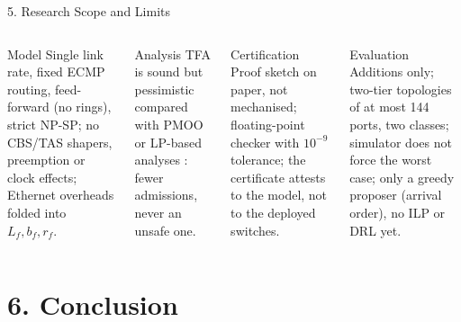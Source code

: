 \documentclass[xcolor=x11names,t,aspectratio=169]{beamer}
\begin{document}
\begin{frame}{5. Research Scope and Limits}
\small
\begin{columns}[T,totalwidth=\textwidth]
\begin{block}{Model}
Single link rate, fixed ECMP routing, feed-forward (no rings), strict NP-SP; no CBS/TAS shapers, preemption or clock effects; Ethernet overheads folded into $L_f,b_f,r_f$.
\end{block}
\begin{block}{Analysis}
TFA is sound but pessimistic compared with PMOO or LP-based analyses \cite{bondorf2014discodnc,bouillard2018dnc}: fewer admissions, never an unsafe one.
\end{block}
\begin{block}{Certification}
Proof sketch on paper, not mechanised; floating-point checker with $10^{-9}$ tolerance; the certificate attests to the model, not to the deployed switches.
\end{block}
\begin{block}{Evaluation}
Additions only; two-tier topologies of at most 144 ports, two classes; simulator does not force the worst case; only a greedy proposer (arrival order), no ILP or DRL yet.
\end{block}
\end{columns}
\end{frame}

\section{6. Conclusion}
\end{document}

